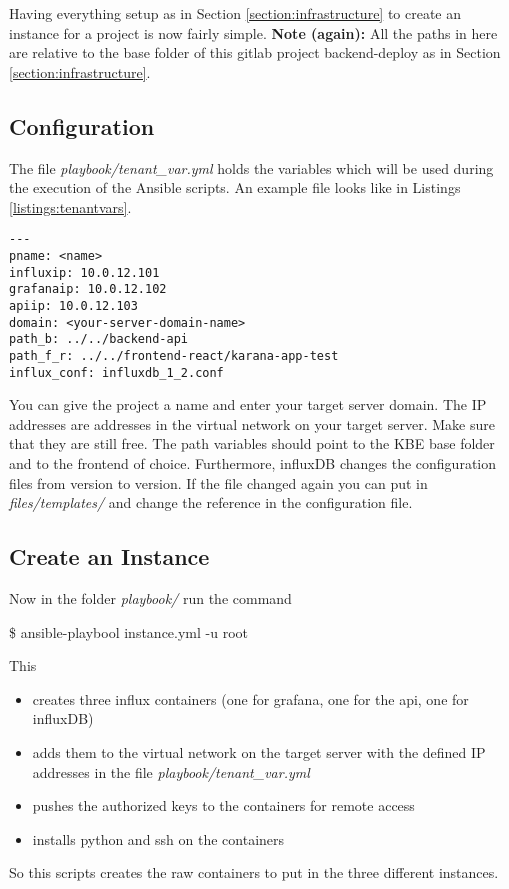 Having everything setup as in Section \ref{section:infrastructure} to create an instance for a project is now fairly simple.
\textbf{Note (again):} All the paths in here are relative to the base folder of this gitlab project backend-deploy as in Section \ref{section:infrastructure}.

\subsection{Configuration}
The file \textit{playbook/tenant\_var.yml} holds the variables which will be used during the execution of the Ansible scripts. An example file looks like in Listings \ref{listings:tenantvars}.
\begin{lstlisting}[caption={Example of Ansible hosts file},label={listings:tenantvars}]
---
pname: <name>
influxip: 10.0.12.101
grafanaip: 10.0.12.102
apiip: 10.0.12.103
domain: <your-server-domain-name>
path_b: ../../backend-api
path_f_r: ../../frontend-react/karana-app-test
influx_conf: influxdb_1_2.conf
\end{lstlisting}
You can give the project a name and enter your target server domain. The IP addresses are addresses in the virtual network on your target server. Make sure that they are still free. The path variables should point to the KBE base folder and to the frontend of choice. Furthermore, influxDB changes the configuration files from version to version. If the file changed again you can put in \textit{files/templates/} and change the reference in the configuration file. 

\subsection{Create an Instance}
Now in the folder \textit{playbook/} run the command
\begin{tcolorbox}
	\$	ansible-playbool instance.yml -u root
\end{tcolorbox}
This 
\begin{itemize}
	\item creates three influx containers (one for grafana, one for the api, one for influxDB)
	\item adds them to the virtual network on the target server with the defined IP addresses in the file \textit{playbook/tenant\_var.yml}
	\item pushes the authorized keys to the containers for remote access
	\item installs python and ssh on the containers
\end{itemize}
So this scripts creates the raw containers to put in the three different instances.

